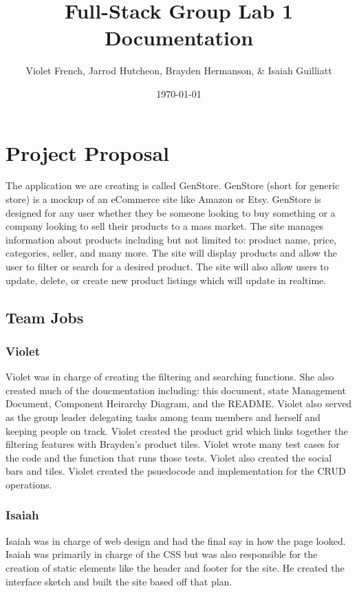 \documentclass{article}[12pt]
\title{Full-Stack Group Lab 1 Documentation}
\author{Violet French, Jarrod Hutcheon, Brayden Hermanson, \& Isaiah Guilliatt}
\date{\today}
\begin{document}
\maketitle
\tableofcontents  %
\listoffigures    %
\newpage

\section{Project Proposal}
The application we are creating is called GenStore. GenStore (short for generic store) is a mockup of an eCommerce site like Amazon or Etsy. GenStore is designed for any user whether they be someone looking to buy something or a company looking to sell their products to a mass market. The site manages information about products including but not limited to: product name, price, categories, seller, and many more. The site will display products and allow the user to filter or search for a desired product. The site will also allow users to update, delete, or create new product listings which will update in realtime.

\subsection{Team Jobs}
\subsubsection{Violet}
Violet was in charge of creating the filtering and searching functions. She also created much of the doucmentation including: this document, state Management Document, Component Heirarchy Diagram, and the README. Violet also served as the group leader delegating tasks among team members and herself and keeping people on track. Violet created the product grid which links together the filtering features with Brayden's product tiles. Violet wrote many test cases for the code and the function that runs those tests. Violet also created the social bars and tiles. Violet created the psuedocode and implementation for the CRUD operations.
\subsubsection{Isaiah}
Isaiah was in charge of web design and had the final say in how the page looked. Isaiah was primarily in charge of the CSS but was also responsible for the creation of static elements like the header and footer for the site. He created the interface sketch and built the site based off that plan.
\end{document}
